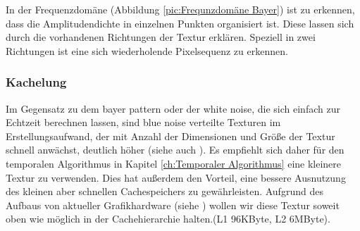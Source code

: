 In der Frequenzdomäne (Abbildung \ref{pic:Frequnzdomäne Bayer}) ist zu erkennen, dass die Amplitudendichte in einzelnen
Punkten organisiert ist. Diese lassen sich durch die vorhandenen
Richtungen der Textur erklären. Speziell in zwei Richtungen ist eine sich
wiederholende Pixelsequenz zu erkennen.

\subsubsection{Kachelung}
\label{ch:Content1:sec:blue noise:Kachelung}

Im Gegensatz zu dem bayer pattern oder der white noise, die sich einfach zur Echtzeit berechnen lassen,
sind blue noise verteilte Texturen im Erstellungsaufwand, der mit Anzahl der Dimensionen 
und Größe der Textur schnell anwächst, deutlich höher (siehe auch \cite{bluenoisechrisschied}). 
Es empfiehlt sich daher für den temporalen Algorithmus in Kapitel \ref{ch:Temporaler Algorithmus} eine 
kleinere Textur zu verwenden.
Dies hat außerdem den Vorteil, eine bessere Ausnutzung des kleinen aber schnellen Cachespeichers zu gewährleisten.
Aufgrund des Aufbaus von aktueller Grafikhardware (siehe \cite{turingarchitecture}) wollen wir diese Textur
soweit oben wie möglich in der Cachehierarchie halten.(L1 96KByte, L2 6MByte).

